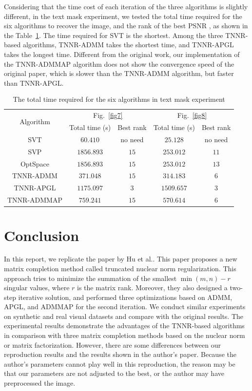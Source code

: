 \documentclass{article}
\begin{document}
{Considering that the time cost of each iteration of the three algorithms is slightly different, in the text mask experiment, we tested the total time required for the six algorithms to recover the image, and the rank of the best PSNR , as shown in the Table~\ref{t3}. The time required for SVT is the shortest. Among the three TNNR-based algorithms, TNNR-ADMM takes the shortest time, and TNNR-APGL takes the longest time. Different from the original work, our implementation of the TNNR-ADMMAP algorithm does not show the convergence speed of the original paper, which is slower than the TNNR-ADMM algorithm, but faster than TNNR-APGL.

\begin{table}
	\caption{The total time required for the six algorithms in text mask experiment}
	\label{t3}
	\centering
	\renewcommand{\arraystretch}{1.25} 
	\begin{tabular}{ccccc}
		\toprule
		\multirow{2}{*}{Algorithm}  & \multicolumn{2}{c}{Fig.~\ref{fig7}} & \multicolumn{2}{c}{Fig.~\ref{fig8}} \\
		\cmidrule(r){2-3} \cmidrule(r){4-5} 
		& Total time (s) & Best rank & Total time (s) & Best rank \\
		\midrule
		SVT & $60.410$ & no need &   $25.128$ &  no need \\
		SVP & $1856.893$ & $15$ & $253.012$ & $11$ \\
		OptSpace & $1856.893$ & $15$ & $253.012$ & $13$ \\
		TNNR-ADMM &  $371.048$ & $15$ & $314.183$ & $6$\\
		TNNR-APGL & $1175.097$ & $3$ & $1509.657$ & $3$\\
		TNNR-ADMMAP & $759.241$ & $15$ & $570.614$ & $6$\\
 		\bottomrule
	\end{tabular}
\end{table}

\section{Conclusion}
\label{s5}
In this report, we replicate the paper by Hu et al.\cite{hu.he201309}. This paper proposes a new matrix completion method called truncated nuclear
norm regularization. This approach tries to minimize the summation of the smallest $\min (m,n)-r$ singular values, where $r$ is the matrix rank. 
Moreover, they also designed a two-step iterative solution, and performed three optimizations based on ADMM, APGL, and ADMMAP for the second iteration. We conduct similar experiments on synthetic and real visual datasets and compare with the original results. The experimental results demonstrate the advantages of the TNNR-based algorithms in comparison with
three matrix completion methods based on the nuclear norm or matrix factorization. However, there are some differences between our reproduction results and the results shown in the author's paper. Because the author's parameters cannot play well in this reproduction, the reason may be that our parameters are not adjusted to the best, or the author may have preprocessed the image.

}
\end{document}
